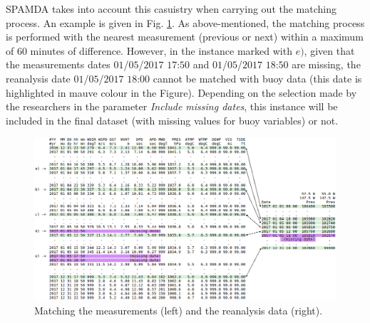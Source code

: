 \documentclass[review]{elsarticle}
\begin{document}
		SPAMDA takes into account this casuistry when carrying out the matching process. An example is given in Fig. \ref{fig:matchingMeasurements}. As above-mentioned, the matching process is performed with the nearest measurement (previous or next) within a maximum of 60 minutes of difference. However, in the instance marked with $e)$, given that the measurements dates $01$/$05$/$2017$ $17$:$50$ and $01$/$05$/$2017$ $18$:$50$ are missing, the reanalysis date $01$/$05$/$2017$ $18$:$00$ cannot be matched with buoy data (this date is highlighted in mauve colour in the Figure). Depending on the selection made by the researchers in the parameter \textit{Include missing dates}, this instance will be included in the final dataset (with missing values for buoy variables) or not.
		
		\begin{figure}[ht!]
			\centering
			\includegraphics[scale=0.36]{figures/FigureMatchingMeasurements.png}
			\caption{Matching the measurements (left) and the reanalysis data (right).}
			\label{fig:matchingMeasurements}
		\end{figure}
\end{document}
